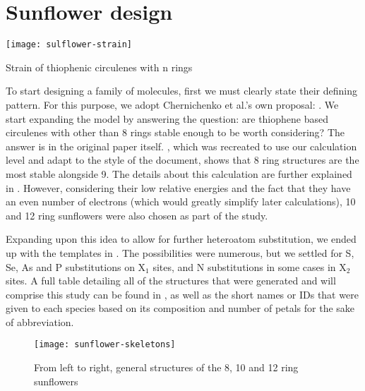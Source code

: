 \section{Sunflower design}

\begin{marginfigure}
    \texttt{[image: sulflower-strain]}
    \caption[Strain of thiophenic circulenes]{Strain of thiophenic circulenes with n rings}
\end{marginfigure}

To start designing a family of molecules, first we must clearly state their defining pattern.
For this purpose, we adopt Chernichenko et al.'s own proposal: .
We start expanding the model by answering the question: are thiophene based circulenes with other than 8 rings stable enough to be worth considering?
The answer is in the original paper itself.
, which was recreated to use our calculation level and adapt to the style of the document, shows that 8 ring structures are the most stable alongside 9.
The details about this calculation are further explained in .
However, considering their low relative energies and the fact that they have an even number of electrons (which would greatly simplify later calculations), 10 and 12 ring sunflowers were also chosen as part of the study.

Expanding upon this idea to allow for further heteroatom substitution, we ended up with the templates in .
The possibilities were numerous, but we settled for S, Se, As and P substitutions on X$_1$ sites, and N substitutions in some cases in X$_2$ sites.
A full table detailing all of the structures that were generated and will comprise this study can be found in , as well as the short names or IDs that were given to each species based on its composition and number of petals for the sake of abbreviation.

\begin{figure*}
    \centering
    \texttt{[image: sunflower-skeletons]}
    \caption[General structures of the sunflower family]{From left to right, general structures of the 8, 10 and 12 ring sunflowers}
\end{figure*}

